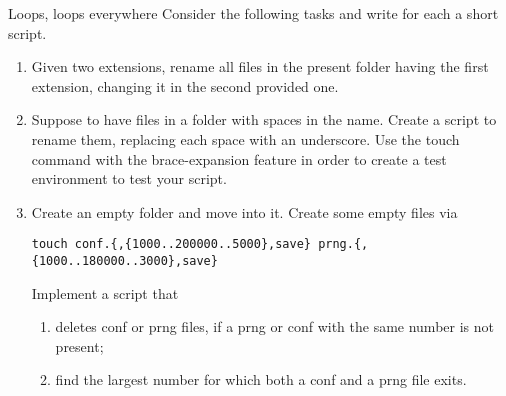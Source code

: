 
\begin{exercise}[Instructive]{Loops, loops everywhere}
    Consider the following tasks and write for each a short script.
    \begin{enumerate}[after=\vspace{-0.6\baselineskip}]
        \item Given two extensions, rename all files in the present folder having the first extension, changing it in the second provided one.
        \item Suppose to have files in a folder with spaces in the name.
              Create a script to rename them, replacing each space with an underscore.
              Use the touch command with the brace-expansion feature in order to create a test environment to test your script.
        \item Create an empty folder and move into it.
              Create some empty files via
              \begin{lstlisting}[style=MyBash, numbers=none]
                  touch conf.{,{1000..200000..5000},save} prng.{,{1000..180000..3000},save}
              \end{lstlisting}
              Implement a script that
              \begin{enumerate}[after=\vspace{-0.6\baselineskip}]
                  \item deletes conf or prng files, if a prng or conf with the same number is not present;
                  \item find the largest number for which both a conf and a prng file exits.
              \end{enumerate}
    \end{enumerate}
    \bigskip
\end{exercise}
